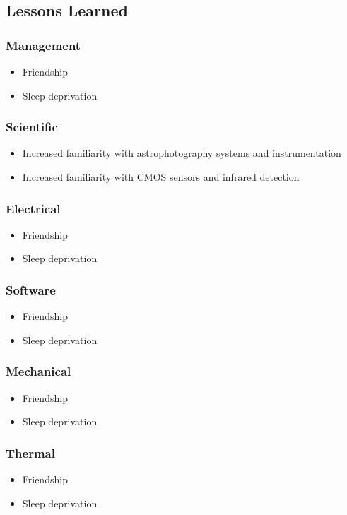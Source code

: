 \pagebreak
\subsection{Lessons Learned}

\subsubsection{Management}

\begin{itemize}
    \item Friendship
    \item Sleep deprivation
\end{itemize}


\subsubsection{Scientific}

\begin{itemize}
    \item Increased familiarity with astrophotography systems and instrumentation
    \item Increased familiarity with CMOS sensors and infrared detection 
\end{itemize}


\subsubsection{Electrical}
 
\begin{itemize}
    \item Friendship
    \item Sleep deprivation
\end{itemize}


\subsubsection{Software }

\begin{itemize}
    \item Friendship
    \item Sleep deprivation
\end{itemize}


\subsubsection{Mechanical }

\begin{itemize}
    \item Friendship
    \item Sleep deprivation
\end{itemize}


\subsubsection{Thermal }
\begin{itemize}
    \item Friendship
    \item Sleep deprivation
\end{itemize}
